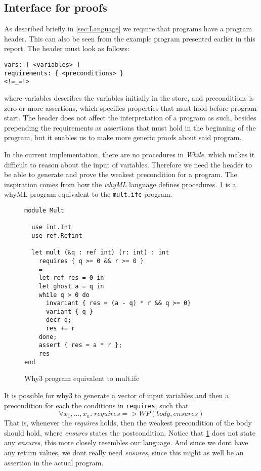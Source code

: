 \subsection{Interface for proofs}\label{sec:interface}
As described briefly in \cref{sec:Language} we require that programs have a program header.
This can also be seen from the example program presented earlier in this report.
The header must look as follows:
\begin{lstlisting}
vars: [ <variables> ]
requirements: { <preconditions> }
<!=_=!>
\end{lstlisting}
where \<variables\> describes the variables initially in the store, and \<preconditions\> is zero or more assertions, which specifies properties that must hold before program start.
The header does not affect the interpretation of a program as such, besides prepending the requirements as assertions that must hold in the beginning of the program, but it enables us to make more generic proofs about said program.

In the current implementation, there are no procedures in \textit{While}, which makes it difficult to reason about the input of variables.
Therefore we need the header to be able to generate and prove the weakest precondition for a program.
The inspiration comes from how the \textit{whyML} language defines procedures.
\cref{fig:why3} is a whyML program equivalent to the \texttt{mult.ifc} program.

\begin{figure}[h]
\begin{lstlisting}
module Mult

  use int.Int
  use ref.Refint

  let mult (&q : ref int) (r: int) : int
    requires { q >= 0 && r >= 0 }
    =
    let ref res = 0 in
    let ghost a = q in
    while q > 0 do
      invariant { res = (a - q) * r && q >= 0}
      variant { q }
      decr q;
      res += r
    done;
    assert { res = a * r };
    res
end
\end{lstlisting}
\caption{Why3 program equivalent to mult.ifc}
\label{fig:why3}
\end{figure}

It is possible for why3 to generate a vector of input variables and then a precondition for each the conditions in \texttt{requires}, such that 
$$\forall x_{1},...,x_{n}. \; requires => WP(body, ensures)$$
That is, whenever the \textit{requires} holds, then the weakest precondition of the body should hold, where \textit{ensures} states the postcondition. 
Notice that \cref{fig:why3} does not state any \textit{ensures}, this more closely resembles our language.
And since we dont have any return values, we dont really need \textit{ensures}, since this might as well be an assertion in the actual program.
